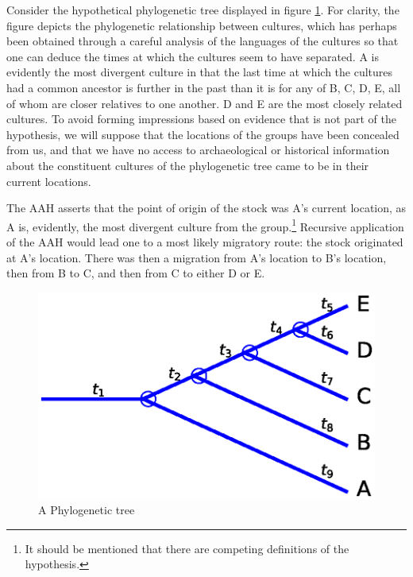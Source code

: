 \documentclass[11pt]{article}
\begin{document}
Consider the hypothetical phylogenetic tree displayed in figure \ref{fig1}. For clarity, the figure depicts the phylogenetic relationship between cultures, which has perhaps been obtained through a careful analysis of the languages of the cultures so that one can deduce the times at which the cultures seem to have separated. A is evidently the most divergent culture in that the last time at which the cultures had a common ancestor is further in the past than it is for any of B, C, D, E, all of whom are closer relatives to one another. D and E are the most closely related cultures. To avoid forming impressions based on evidence that is not part of the hypothesis, we will suppose that the locations of the
groups have been concealed from us, and that we have no access to archaeological or historical information about the constituent cultures of the phylogenetic tree came to be in their current locations.

The AAH asserts that the point of origin of the  stock was A's current location, as A is, evidently, the most divergent culture from the group.\footnote{It should be mentioned that there are competing definitions of the hypothesis.} Recursive application of the AAH would lead one to a most likely migratory route: the stock originated at A's location. There was then a migration from A's location to B's location, then from B to C, and then from C to either D or E.  

\begin{figure}
\begin{center}
\includegraphics[width=\textwidth]{AncillaryFiles//figure1.eps}
\caption{A Phylogenetic tree} \label{fig1}
\end{center} 
\end{figure}
\end{document}
